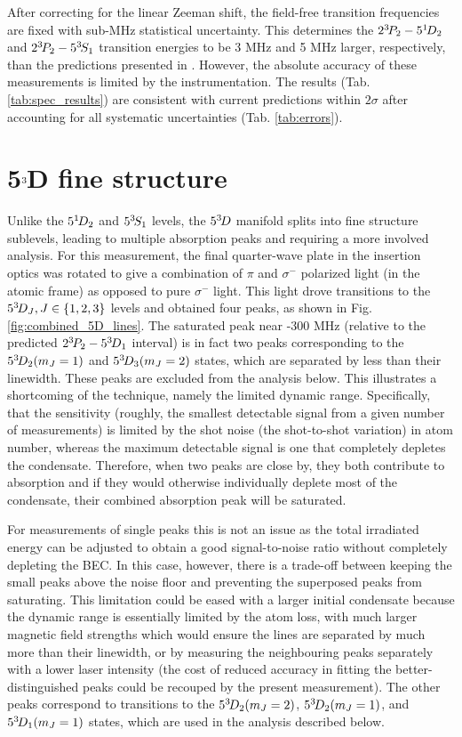 	After correcting for the linear Zeeman shift, the field-free transition frequencies are fixed with sub-MHz statistical uncertainty.
	This determines the $2^{3\!} P_2-5^{1\!} D_2$ and $2^{3\!} P_2-5^{3\!} S_1$ transition energies to be 3 MHz and 5 MHz larger, respectively, than the predictions presented in \cite{Drake07}.
	However, the absolute accuracy of these measurements is limited by the instrumentation.
	The results (Tab.	\ref{tab:spec_results}) are consistent with current predictions \cite{Drake07} within $2\sigma$ after accounting for all systematic uncertainties (Tab.	\ref{tab:errors}).




\section{5$^{3\!}$D fine structure}

	Unlike the $5^{1\!} D_2$ and $5^{3\!} S_1$ levels, the $5^{3\!} D$ manifold splits into fine structure sublevels, leading to multiple absorption peaks and requiring a more involved analysis.
	For this measurement, the final quarter-wave plate in the insertion optics was rotated to give a combination of $\pi$ and $\sigma^-$ polarized light (in the atomic frame) as opposed to pure $\sigma^-$ light.
	This light drove transitions to the $5^{3\!} D_J, J\in\{1,2,3\}$ levels and obtained four peaks, as shown in Fig.	\ref{fig:combined_5D_lines}.
	The saturated peak near -300 MHz (relative to the predicted $2^{3\!} P_2 - 5^{3\!} D_1$ interval) is in fact two peaks corresponding to the $5^{3\!} D_2(m_J=1)$ and $5^{3\!} D_3(m_J=2)$ states, which are separated by less than their linewidth. These peaks are excluded from the analysis below.
	This illustrates a shortcoming of the technique, namely the limited dynamic range.
	Specifically, that the sensitivity (roughly, the smallest detectable signal from a given number of measurements) is limited by the shot noise (the shot-to-shot variation) in atom number, whereas the maximum detectable signal is one that completely depletes the condensate. Therefore, when two peaks are close by, they both contribute to absorption and if they would otherwise individually deplete most of the condensate, their combined absorption peak will be saturated.

	For measurements of single peaks this is not an issue as the total irradiated energy can be adjusted to obtain a good signal-to-noise ratio without completely depleting the BEC.
	In this case, however, there is a trade-off between keeping the small peaks above the noise floor and preventing the superposed peaks from saturating.
	This limitation could be eased with a larger initial condensate because the dynamic range is essentially limited by the atom loss, with much larger magnetic field strengths which would ensure the lines are separated by much more than their linewidth, or by measuring the neighbouring peaks separately with a lower laser intensity (the cost of reduced accuracy in fitting the better-distinguished peaks could be recouped by the present measurement). 
	The other peaks correspond to transitions to the $5^{3\!} D_2(m_J=2)$, $5^{3\!} D_2(m_J=1)$, and $5^{3\!} D_1(m_J=1)$ states, which are used in the analysis described below.

